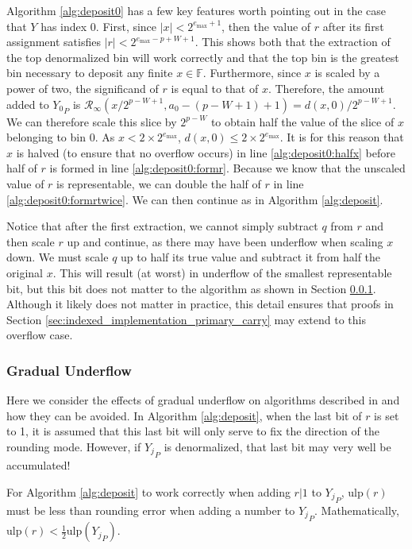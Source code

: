 \documentclass[12pt]{article}
\providecommand{\F}{\ensuremath{\mathbb{F}}}
\providecommand{\max}{\ensuremath{\text{max}}}
\providecommand{\ulp}{\ensuremath{\text{ulp}}}
\providecommand{\roundtonearestinfty}{\ensuremath{\mathcal{R}_\text{$\infty$}}}
\theoremstyle{plain}
\numberwithin{equation}{section}
\begin{document}
      Algorithm \ref{alg:deposit0} has a few key features worth pointing out in the case that $Y$ has index 0. First, since $|x| < 2^{e_{\max} + 1}$, then the value of $r$ after its first assignment satisfies $|r| < 2^{e_{\max} - p + W + 1}$. This shows both that the extraction of the top denormalized bin will work correctly and that the top bin is the greatest bin necessary to deposit any finite $x \in \F$.
      Furthermore, since $x$ is scaled by a power of two, the significand of $r$ is equal to that of $x$.
      Therefore, the amount added to ${Y_0}_P$ is $\roundtonearestinfty(x/2^{p - W + 1}, a_0 - (p - W + 1) + 1) = d(x, 0)/2^{p - W + 1}$. We can therefore scale this slice by $2^{p - W}$ to obtain half the value of the slice of $x$ belonging to bin $0$. As $x < 2 \times 2^{e_{\max}}$, $d(x, 0) \leq 2 \times 2^{e_{\max}}$. It is for this reason that $x$ is halved (to ensure that no overflow occurs) in line \ref{alg:deposit0:halfx} before half of $r$ is formed in line \ref{alg:deposit0:formr}. Because we know that the unscaled value of $r$ is representable, we can double the half of $r$ in line \ref{alg:deposit0:formrtwice}. We can then continue as in Algorithm \ref{alg:deposit}.

      Notice that after the first extraction, we cannot simply subtract $q$ from $r$ and then scale $r$ up and continue, as there may have been underflow when scaling $x$ down. We must scale $q$ up to half its true value and subtract it from half the original $x$. This will result (at worst) in underflow of the smallest representable bit, but this bit does not matter to the algorithm as shown in Section \ref{sec:indexed_implementation_underflow_gradual}. Although it likely does not matter in practice, this detail ensures that proofs in Section \ref{sec:indexed_implementation_primary_carry} may extend to this overflow case.
    \subsubsection{Gradual Underflow}
      \label{sec:indexed_implementation_underflow_gradual}
      Here we consider the effects of gradual underflow on algorithms described in \cite{repsum} and how they can be avoided. In Algorithm \ref{alg:deposit}, when the last bit of $r$ is set to 1, it is assumed that this last bit will only serve to fix the direction of the rounding mode. However, if ${Y_j}_P$ is denormalized, that last bit may very well be accumulated!

      For Algorithm \ref{alg:deposit} to work correctly when adding $r | 1$ to ${Y_j}_P$, $\ulp(r)$ must be less than rounding error when adding a number to ${Y_j}_P$. Mathematically, $\ulp(r) < \frac{1}{2}\ulp({Y_j}_P)$.
\end{document}
